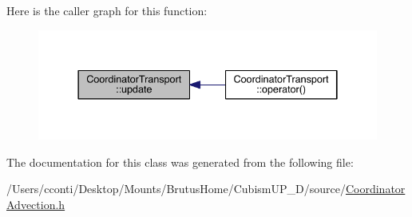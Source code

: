 Here is the caller graph for this function\+:\nopagebreak
\begin{figure}[H]
\begin{center}
\leavevmode
\includegraphics[width=337pt]{da/dda/class_coordinator_transport_acde1d168a37ca0593278d96b0349f6f3_icgraph}
\end{center}
\end{figure}




The documentation for this class was generated from the following file\+:\begin{DoxyCompactItemize}
\item 
/\+Users/cconti/\+Desktop/\+Mounts/\+Brutus\+Home/\+Cubism\+U\+P\+\_\+D/source/\hyperlink{_coordinator_advection_8h}{Coordinator\+Advection.\+h}\end{DoxyCompactItemize}
